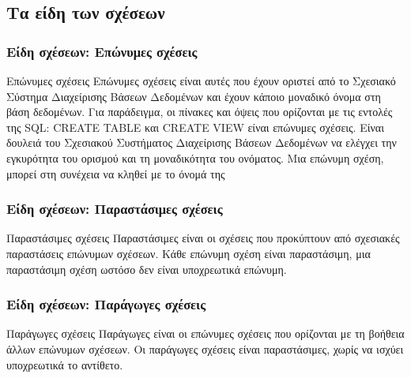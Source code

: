 \subsection[\textgreek{Είδη}]{\textgreek{Τα είδη των σχέσεων}}

\begin{frame}
\frametitle{Είδη σχέσεων: Επώνυμες σχέσεις}
\begin{minipage}{\wE}
\begin{block}{Επώνυμες σχέσεις}
{\crr Επώνυμες} σχέσεις είναι αυτές που έχουν οριστεί από το 
{\cbb Σχεσιακό Σύστημα Διαχείρισης Βάσεων Δεδομένων} και έχουν κάποιο
μοναδικό όνομα στη βάση δεδομένων. Για παράδειγμα, οι πίνακες και όψεις που ορίζονται με τις
εντολές της {\sq SQL}: {\sq CREATE TABLE} και {\sq CREATE VIEW} είναι επώνυμες σχέσεις.
Είναι δουλειά του {\bb Σχεσιακού Συστήματος Διαχείρισης Βάσεων Δεδομένων} να 
ελέγχει την εγκυρότητα του ορισμού και τη μοναδικότητα
του ονόματος. Μια επώνυμη σχέση, μπορεί στη συνέχεια να κληθεί με το όνομά της 
\end{block}
\end{minipage}
\end{frame}


\begin{frame}
\frametitle{Είδη σχέσεων: Παραστάσιμες σχέσεις}
\begin{minipage}{\wE}
  \begin{block}{Παραστάσιμες σχέσεις}
    {\crr Παραστάσιμες} είναι οι σχέσεις που προκύπτουν από σχεσιακές παραστάσεις επώνυμων
    σχέσεων. Κάθε επώνυμη σχέση είναι παραστάσιμη, μια παραστάσιμη σχέση ωστόσο δεν είναι
    υποχρεωτικά επώνυμη.
  \end{block}
\end{minipage}
\end{frame}


\begin{frame}
\frametitle{Είδη σχέσεων: Παράγωγες σχέσεις}
\begin{minipage}{\wE}
  \begin{block}{Παράγωγες σχέσεις}
    {\crr Παράγωγες} είναι οι επώνυμες σχέσεις που ορίζονται με τη βοήθεια άλλων επώνυμων σχέσεων.
    Οι παράγωγες σχέσεις είναι παραστάσιμες, χωρίς να ισχύει υποχρεωτικά το αντίθετο.
  \end{block}
\end{minipage}
\end{frame}


